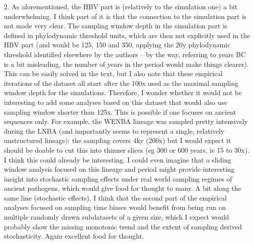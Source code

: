 \documentclass[11pt]{article}
\begin{document}
2. As aforementioned, the HBV part is (relatively to the simulation one) a bit underwhelming. I think part of it is that the connection to the simulation part is not made very clear. The sampling window depth in the simulation part is defined in phylodynamic threshold units, which are then not explicitly used in the HBV part (and would be 125, 150 and 350, applying the 20y phylodynamic threshold identified elsewhere by the authors – by the way, referring to years BC is a bit misleading, the number of years in the period would make things clearer). This can be easily solved in the text, but I also note that these empirical iterations of the dataset all start after the 100x used as the maximal sampling window depth for the simulations. Therefore, I wonder whether it would not be interesting to add some analyses based on this dataset that would also use sampling window shorter than 125x. This is possible if one focuses on ancient sequences only. For example, the WENBA lineage was sampled pretty intensively during the LNBA (and importantly seems to represent a single, relatively unstructured lineage): the sampling covers 4ky (200x) but I would expect it should be doable to cut this into thinner slices (eg 300 or 600 years, ie 15 to 30x). I think this could already be interesting. I could even imagine that a sliding window analysis focused on this lineage and period might provide interesting insight into stochastic sampling effects under real world sampling regimes of ancient pathogens, which would give food for thought to many. A bit along the same line (stochastic effects), I think that the second part of the empirical analyses focused on sampling time biases would benefit from being run on multiple randomly drawn subdatasets of a given size, which I expect would probably show the missing monotonic trend and the extent of sampling derived stochasticity. Again excellent food for thought.
\end{document}
